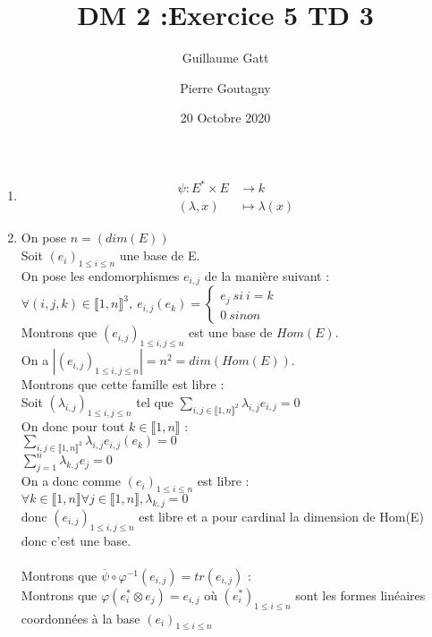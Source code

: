 \documentclass{article}
\title{DM 2 :Exercice 5 TD 3}
\author{Guillaume Gatt \and Pierre Goutagny}
\date{20 Octobre 2020}
\begin{document}
\maketitle
\thispagestyle{empty}
\begin{enumerate}[1., start=1]
    \item \begin{align*}
            \psi \colon E^{\ast} \times E &\longrightarrow k \\
                   (\lambda, x) &\longmapsto \lambda(x)
          \end{align*}

    \item
    On pose $n=(dim(E))$ \\
   Soit $(e_i)_{ 1\leq i \leq n}$ une base de E. \\
   On pose les endomorphismes $e_{i,j}$ de la manière suivant : \\
   $\forall (i,j,k) \in \llbracket 1,n\rrbracket^3,\ e_{i,j}(e_k)=\begin{cases}
   e_j \ si \ i=k \\
   0 \ sinon
   \end{cases}$ \\
   Montrons que $(e_{i,j})_{ 1\leq i,j \leq n}$ est une base de $Hom(E)$. \\
   On a $|(e_{i,j})_{ 1\leq i,j \leq n}|=n^2=dim(Hom(E))$. \\
   Montrons que cette famille est libre : \\
   Soit $(\lambda_{i,j})_{1 \leq i,j \leq n}$ tel que $\sum_{i,j \in \llbracket 1 , n \rrbracket^2} \lambda_{i,j} e_{i,j} =0$ \\
   On donc pour tout $k \in \llbracket1,n\rrbracket$ : \\
   $\sum_{i,j \in \llbracket 1 , n \rrbracket^2} \lambda_{i,j} e_{i,j}(e_k) =0$ \\
   $\sum_{j=1}^{n} \lambda_{k,j} e_j =0$ \\
   On a donc comme $(e_i)_{ 1\leq i \leq n}$ est libre : \\
   $\forall k \in \llbracket1,n\rrbracket \forall j \in \llbracket 1,n \rrbracket, \lambda_{k,j}=0$ \\
   donc $(e_{i,j})_{ 1\leq i,j \leq n}$ est libre et a pour cardinal la dimension de Hom(E) donc c'est une base. \\ \\
   Montrons que $\overline{\psi} \circ \varphi^{-1}(e_{i,j})=tr(e_{i,j})$ : \\
   Montrons que $\varphi(e^\ast_i \otimes e_{j})= e_{i,j}$ où $(e^*_i)_{ 1\leq i\leq n}$ sont les formes linéaires coordonnées à la base $(e_i)_{ 1\leq i \leq n}$ \\

\end{enumerate}
\end{document}
